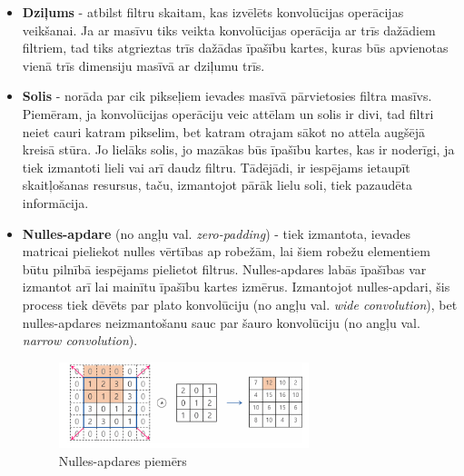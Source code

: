 \begin{itemize}
	\item \textbf{Dziļums} - atbilst filtru skaitam, kas izvēlēts konvolūcijas operācijas veikšanai. Ja ar masīvu tiks veikta konvolūcijas operācija ar trīs dažādiem filtriem, tad tiks atgrieztas trīs dažādas īpašību kartes, kuras būs apvienotas vienā trīs dimensiju masīvā ar dziļumu trīs.
	\item \textbf{Solis} - norāda par cik pikseļiem ievades masīvā pārvietosies filtra masīvs. Piemēram, ja konvolūcijas operāciju veic attēlam un solis ir divi, tad filtri neiet cauri katram pikselim, bet katram otrajam sākot no attēla augšējā kreisā stūra. Jo lielāks solis, jo mazākas būs īpašību kartes, kas ir noderīgi, ja tiek izmantoti lieli vai arī daudz filtru. Tādējādi, ir iespējams ietaupīt skaitļošanas resursus, taču, izmantojot pārāk lielu soli, tiek pazaudēta informācija.
	\item \textbf{Nulles-apdare} (no angļu val. \textit{zero-padding}) - tiek izmantota, ievades matricai pieliekot nulles vērtības ap robežām, lai šiem robežu elementiem būtu pilnībā iespējams pielietot filtrus. Nulles-apdares labās īpašības var izmantot arī lai mainītu īpašību kartes izmērus. Izmantojot nulles-apdari, šis process tiek dēvēts par plato konvolūciju (no angļu val. \textit{wide convolution}), bet nulles-apdares neizmantošanu sauc par šauro konvolūciju (no angļu val. \textit{narrow convolution}). 
	\begin{figure}[H]%
		\centering
		\includegraphics[height=2.5cm]{images/zero-padding.png} %
		\caption{Nulles-apdares piemērs \cite{zerpad}}%
		\label{fig:example}%
	\end{figure}
\end{itemize}
